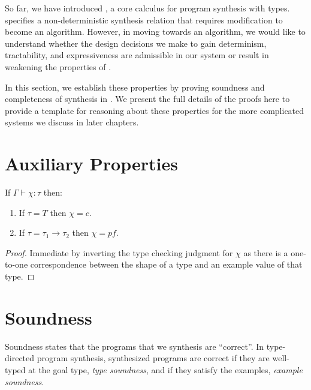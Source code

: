 So far, we have introduced \lsyn{}, a core calculus for program synthesis with types.
\lsyn{} specifies a non-deterministic synthesis relation that requires modification to become an algorithm.
However, in moving towards an algorithm, we would like to understand whether the design decisions we make to gain determinism, tractability, and expressiveness are admissible in our system or result in weakening the properties of \lsyn{}.

In this section, we establish these properties by proving soundness and completeness of synthesis in \lsyn{}.
We present the full details of the proofs here to provide a template for reasoning about these properties for the more complicated systems we discuss in later chapters.

\section{Auxiliary Properties}

\begin{lemma}
  \label{lem:example-value-canonicity}
  If $Γ ⊢ χ : τ$ then:
  \begin{enumerate}
    \item If $τ = T$ then $χ = c$.
    \item If $τ = τ_1 → τ_2$ then $χ = pf$.
  \end{enumerate}
\end{lemma}
\begin{proof}
  Immediate by inverting the type checking judgment for $χ$ as there is a one-to-one correspondence between the shape of a type and an example value of that type.
\end{proof}

\section{Soundness}

Soundness states that the programs that we synthesis are ``correct''.
In type-directed program synthesis, synthesized programs are correct if they are well-typed at the goal type, \emph{type soundness}, and if they satisfy the examples, \emph{example soundness}.

